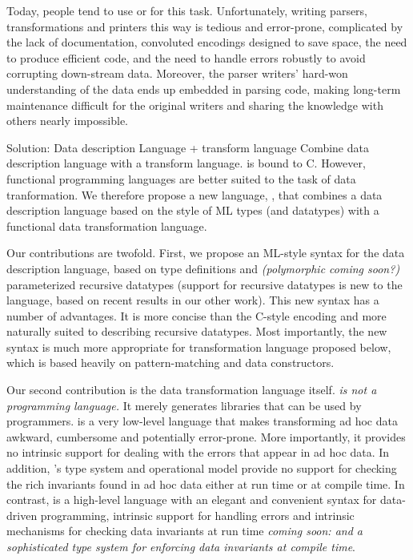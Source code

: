 Today, people tend to use \C{} or \perl{} for this task.
Unfortunately, writing parsers, transformations and printers this way
is tedious and error-prone, complicated by the lack of documentation,
convoluted encodings designed to save space, the need to produce
efficient code, and the need to handle errors robustly to avoid
corrupting down-stream data.  Moreover, the parser writers' hard-won
understanding of the data ends up embedded in parsing code, making
long-term maintenance difficult for the original writers and sharing
the knowledge with others nearly impossible.

Solution: Data description Language + transform language
Combine data description language with a transform language.
\pads{} is bound to C. However, functional programming languages are
better suited to the task of data tranformation. We therefore propose
a new language, \datatype{}, that combines a data description language
based on the style of ML types (and datatypes) with a functional data
transformation language. 

Our contributions are twofold. First, we propose an ML-style syntax
for the \pads{} data description language, based on type definitions
and {\em(polymorphic coming soon?)} parameterized recursive datatypes
(support for recursive datatypes is new to the \pads{} language, based
on recent results in our other work). This new syntax has a number of
advantages. It is more concise than the C-style encoding and more
naturally suited to describing recursive datatypes. Most importantly,
the new syntax is much more appropriate for transformation language
proposed below, which is based heavily on pattern-matching and data
constructors.

Our second contribution is the data transformation language itself.
{\em \pads{} is not a programming language.}  It merely generates
libraries that can be used by \C{} programmers.  \C{} is a very
low-level language that makes transforming ad hoc data awkward,
cumbersome and potentially error-prone.  More importantly, it provides
no intrinsic support for dealing with the errors that appear in ad hoc
data.  In addition, \C's type system and operational model provide no
support for checking the rich invariants found in ad hoc data either
at run time or at compile time.  In contrast, \datatype{} is a
high-level language with an elegant and convenient syntax for
data-driven programming, intrinsic support for handling errors and
intrinsic mechanisms for checking data invariants at run time {\em
  coming soon: and a sophisticated type system for enforcing data
  invariants at compile time}. 

